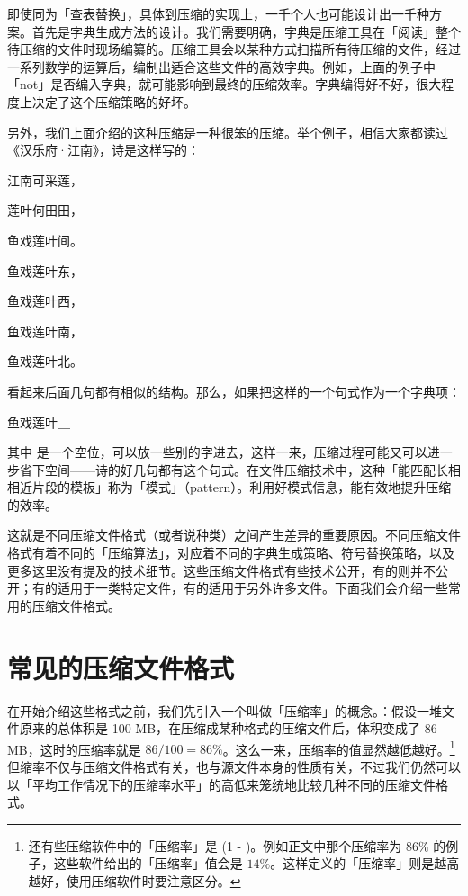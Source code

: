 即使同为「查表替换」，具体到压缩的实现上，一千个人也可能设计出一千种方案。首先是字典生成方法的设计。我们需要明确，字典是压缩工具在「阅读」整个待压缩的文件时现场编纂的。压缩工具会以某种方式扫描所有待压缩的文件，经过一系列数学的运算后，编制出适合这些文件的高效字典。例如，上面的例子中「not」是否编入字典，就可能影响到最终的压缩效率。字典编得好不好，很大程度上决定了这个压缩策略的好坏。

另外，我们上面介绍的这种压缩是一种很笨的压缩。举个例子，相信大家都读过《汉乐府·江南》，诗是这样写的：

\begin{quoting}
  \centering
  江南可采莲，\par
  莲叶何田田，\par
  鱼戏莲叶间。\par
  鱼戏莲叶东，\par
  鱼戏莲叶西，\par
  鱼戏莲叶南，\par
  鱼戏莲叶北。
\end{quoting}

看起来后面几句都有相似的结构。那么，如果把这样的一个句式作为一个字典项：

\begin{MissingVerbatim}
  鱼戏莲叶＿
\end{MissingVerbatim}

其中  是一个空位，可以放一些别的字进去，这样一来，压缩过程可能又可以进一步省下空间——诗的好几句都有这个句式。在文件压缩技术中，这种「能匹配长相相近片段的模板」称为「模式」（pattern）。利用好模式信息，能有效地提升压缩的效率。

这就是不同压缩文件格式（或者说种类）之间产生差异的重要原因。不同压缩文件格式有着不同的「压缩算法」，对应着不同的字典生成策略、符号替换策略，以及更多这里没有提及的技术细节。这些压缩文件格式有些技术公开，有的则并不公开；有的适用于一类特定文件，有的适用于另外许多文件。下面我们会介绍一些常用的压缩文件格式。

\section{常见的压缩文件格式}

在开始介绍这些格式之前，我们先引入一个叫做「压缩率」的概念。：假设一堆文件原来的总体积是 100 MB，在压缩成某种格式的压缩文件后，体积变成了 86 MB，这时的压缩率就是 $86/100 = 86\%$。这么一来，压缩率的值显然越低越好。\footnote{还有些压缩软件中的「压缩率」是 (1 - )。例如正文中那个压缩率为 $86\%$ 的例子，这些软件给出的「压缩率」值会是 $14\%$。这样定义的「压缩率」则是越高越好，使用压缩软件时要注意区分。}但缩率不仅与压缩文件格式有关，也与源文件本身的性质有关，不过我们仍然可以以「平均工作情况下的压缩率水平」的高低来笼统地比较几种不同的压缩文件格式。

